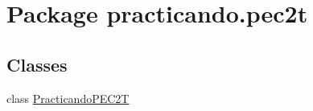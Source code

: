 \hypertarget{namespacepracticando_1_1pec2t}{}\section{Package practicando.\+pec2t}
\label{namespacepracticando_1_1pec2t}
\subsection*{Classes}
\begin{DoxyCompactItemize}
\item 
class \mbox{\hyperlink{classpracticando_1_1pec2t_1_1_practicando_p_e_c2_t}{Practicando\+P\+E\+C2T}}
\end{DoxyCompactItemize}
